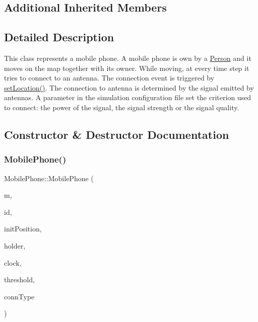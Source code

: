 \subsection*{Additional Inherited Members}


\subsection{Detailed Description}
This class represents a mobile phone. A mobile phone is own by a \mbox{\hyperlink{class_person}{Person}} and it moves on the map together with its owner. While moving, at every time step it tries to connect to an antenna. The connection event is triggered by \mbox{\hyperlink{class_holdable_agent_aec98d2fe325b48d9a84ad3dad44700e0}{set\+Location()}}. The connection to antenna is determined by the signal emitted by antennas. A parameter in the simulation configuration file set the criterion used to connect\+: the power of the signal, the signal strength or the signal quality. 

\subsection{Constructor \& Destructor Documentation}
\mbox{\label{class_mobile_phone_afd7beed70eb2af3baecd9521332ba8eb}} 
\subsubsection{\texorpdfstring{MobilePhone()}{MobilePhone()}}
{\footnotesize\ttfamily Mobile\+Phone\+::\+Mobile\+Phone (\begin{DoxyParamCaption}\item[{const \mbox{\hyperlink{class_map}{Map}} $\ast$}]{m,  }\item[{const unsigned long}]{id,  }\item[{Point $\ast$}]{init\+Position,  }\item[{\mbox{\hyperlink{class_agent}{Agent}} $\ast$}]{holder,  }\item[{const \mbox{\hyperlink{class_clock}{Clock}} $\ast$}]{clock,  }\item[{double}]{threshold,  }\item[{\mbox{\hyperlink{class_holdable_agent_ae2c334b004d7b9c5a999cf2618e4e518}{Holdable\+Agent\+::\+C\+O\+N\+N\+E\+C\+T\+I\+O\+N\+\_\+\+T\+Y\+PE}}}]{conn\+Type }\end{DoxyParamCaption})\hspace{0.3cm}{\ttfamily [explicit]}}

